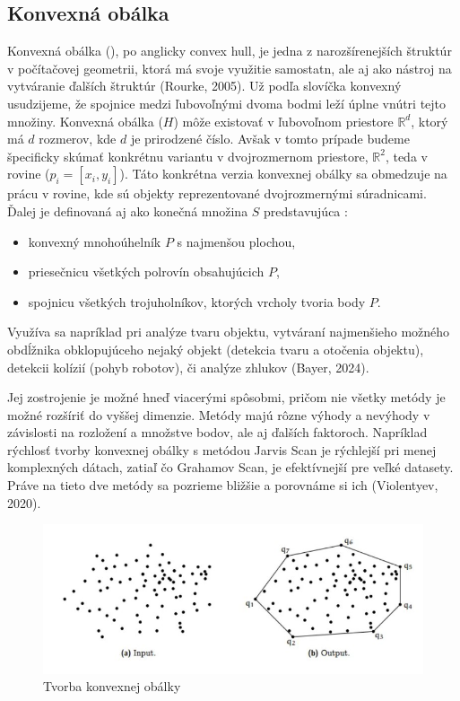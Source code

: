 \documentclass[12pt]{article}
\begin{document}
\subsection*{Konvexná obálka}
Konvexná obálka (), po anglicky convex hull, je jedna z narozšírenejších štruktúr v počítačovej geometrii, ktorá má svoje využitie samostatn, ale aj ako nástroj na vytváranie ďalších štruktúr (Rourke, 2005). Už podľa slovíčka konvexný usudzijeme, že spojnice medzi ľubovoľnými dvoma bodmi leží úplne vnútri tejto množiny. Konvexná obálka (\( H \)) môže existovať v ľubovoľnom priestore \( \mathbb{R}^d \), ktorý má \( d \) rozmerov, kde \( d \) je prirodzené číslo. Avšak v tomto prípade budeme špecificky skúmať konkrétnu variantu v dvojrozmernom priestore, \( \mathbb{R}^2 \), teda v rovine (\( p_i = [x_i, y_i] \)). Táto konkrétna verzia konvexnej obálky sa obmedzuje na prácu v rovine, kde sú objekty reprezentované dvojrozmernými súradnicami. Ďalej je definovaná aj ako konečná množina \( S \) predstavujúca :
\begin{itemize}
    \item konvexný mnohoúhelník \( P \) s najmenšou plochou,
    \item priesečnicu všetkých polrovín obsahujúcich \( P \),
    \item spojnicu všetkých trojuholníkov, ktorých vrcholy tvoria body \( P \).\\
\end{itemize} 
\par Využíva sa napríklad pri analýze tvaru objektu, vytváraní najmenšieho možného obdĺžnika obklopujúceho nejaký objekt (detekcia tvaru a otočenia objektu), detekcii kolízií (pohyb robotov), či analýze zhlukov (Bayer, 2024).
\par Jej zostrojenie je možné hneď viacerými spôsobmi, pričom nie všetky metódy je možné rozšíriť do vyššej dimenzie. Metódy majú rôzne výhody a nevýhody v závislosti na rozložení a množstve bodov, ale aj ďalších faktoroch. Napríklad rýchlosť tvorby konvexnej obálky s metódou Jarvis Scan je rýchlejší pri menej komplexných dátach, zatiaľ čo Grahamov Scan, je  efektívnejší pre veľké datasety. Práve na tieto dve metódy sa pozrieme bližšie a porovnáme si ich (Violentyev, 2020).

\begin{figure}[h]
    \centering
    \includegraphics[width=0.8\linewidth]{latex/image/hull.jpg}
    \caption{Tvorba konvexnej obálky}
    \label{fig:enter-label}
\end{figure} \\
\newpage
\end{document}
